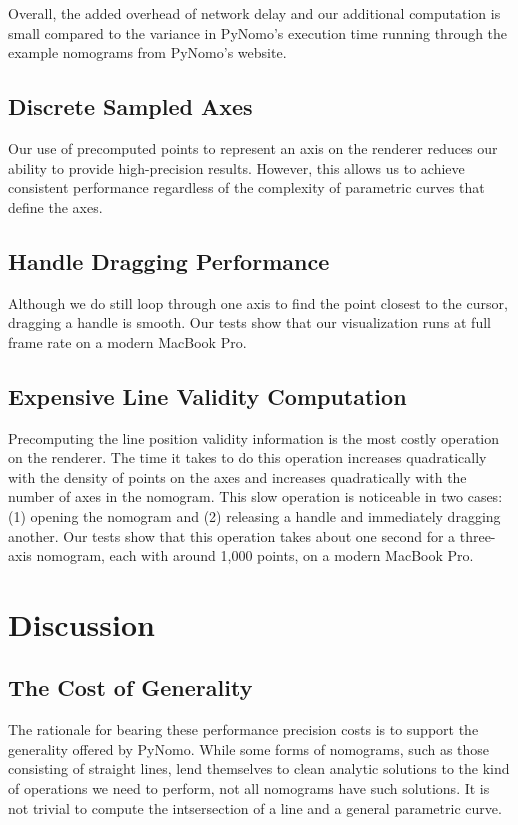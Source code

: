 \documentclass{proc}
\begin{document}
Overall, the added overhead of network delay and our additional
computation is small compared to the variance in PyNomo's execution
time running through the example nomograms from PyNomo's website.

\subsection{Discrete Sampled Axes}
Our use of precomputed points to represent an axis on the renderer
reduces our ability to provide high-precision results.
However, this allows us to achieve consistent performance regardless
of the complexity of parametric curves that define the axes.

\subsection{Handle Dragging Performance}
Although we do still loop through one axis to find the point closest
to the cursor, dragging a handle is smooth.
Our tests show that our visualization runs at full frame rate on a
modern MacBook Pro.

\subsection{Expensive Line Validity Computation}
Precomputing the line position validity information is the most costly
operation on the renderer.
The time it takes to do this operation increases quadratically with
the density of points on the axes and increases quadratically with the
number of axes in the nomogram.
This slow operation is noticeable in two cases: (1) opening the
nomogram and (2) releasing a handle and immediately dragging another.
Our tests show that this operation takes about one second for a
three-axis nomogram, each with around 1,000 points, on a modern
MacBook Pro.

\section{Discussion}

\subsection{The Cost of Generality}
The rationale for bearing these performance precision costs is to
support the generality offered by PyNomo.
While some forms of nomograms, such as those consisting of straight
lines, lend themselves to clean analytic solutions to the kind of
operations we need to perform, not all nomograms have such solutions.
It is not trivial to compute the intsersection of a line and a
general parametric curve.
\end{document}
